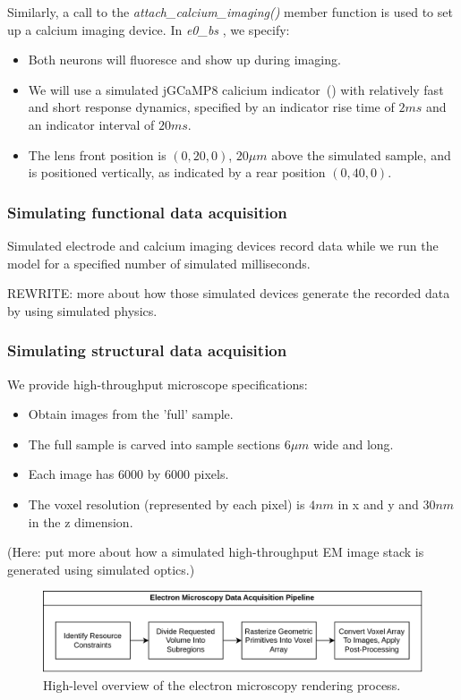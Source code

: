 \documentclass{ldr-article}
\def\firstexp{\textit{e0\_bs} }
\begin{document}
Similarly, a call to the \textit{attach\_calcium\_imaging()} member function is used to set up a calcium imaging device. In \firstexp, we specify:
\begin{itemize}
	\item Both neurons will fluoresce and show up during imaging.
	\item We will use a simulated jGCaMP8 calicium indicator~(\cite{zhang2023}) with relatively fast and short response dynamics, specified by an indicator rise time of $2 ms$ and an indicator interval of $20 ms$.
	\item The lens front position is $(0, 20, 0)$, $20 \mu m$ above the simulated sample, and is positioned vertically, as indicated by a rear position $(0, 40, 0)$.
\end{itemize}

\subsubsection{Simulating functional data acquisition}

Simulated electrode and calcium imaging devices record data while we run the model for a specified number of simulated milliseconds.

\alert{REWRITE:} more about how those simulated devices generate the recorded data by using simulated physics.


\subsubsection{Simulating structural data acquisition}

We provide high-throughput microscope specifications:
\begin{itemize}
	\item Obtain images from the 'full' sample.
	\item The full sample is carved into sample sections $6 \mu m$ wide and long.
	\item Each image has $6000$ by $6000$ pixels.
	\item The voxel resolution (represented by each pixel) is $4 nm$ in x and y and $30 nm$ in the z dimension.
\end{itemize}

(Here: put more about how a simulated high-throughput EM image stack is generated using simulated optics.)

\begin{figure}
	\centering
	\includegraphics[width=1\linewidth]{Figures/VBP_EM_Render_Pipeline.drawio.png}
	\caption{High-level overview of the electron microscopy rendering process.}
	\label{fig:em-pipeline}
\end{figure}
\end{document}
